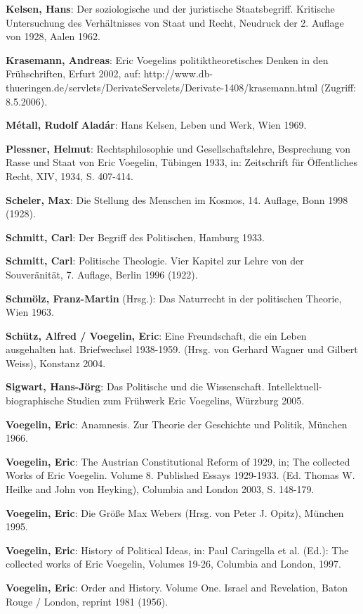 \documentclass[12pt,a4paper,ngerman]{article}
\begin{document}
{\bf Kelsen, Hans}: Der soziologische und der juristische Staatsbegriff.
Kritische Untersuchung des Verhältnisses von Staat und Recht, Neudruck der 2.
Auflage von 1928, Aalen 1962.

{\bf Krasemann, Andreas}: Eric Voegelins politiktheoretisches Denken in den
Frühschriften, Erfurt 2002, auf:
http://www.db-thueringen.de/servlets/DerivateServelets/Derivate-1408/krasemann.html
(Zugriff: 8.5.2006).

{\bf Métall, Rudolf Aladár}: Hans Kelsen, Leben und Werk, Wien 1969.

{\bf Plessner, Helmut}: Rechtsphilosophie und Gesellschaftslehre,
Besprechung von Rasse und Staat von Eric Voegelin, Tübingen 1933, in:
Zeitschrift für Öffentliches Recht, XIV, 1934, S. 407-414.

{\bf Scheler, Max}: Die Stellung des Menschen im Kosmos, 14. Auflage, Bonn
1998 (1928).

{\bf Schmitt, Carl}: Der Begriff des Politischen, Hamburg 1933.

{\bf Schmitt, Carl}: Politische Theologie. Vier Kapitel zur Lehre von
der Souveränität, 7. Auflage, Berlin 1996 (1922).

{\bf Schmölz, Franz-Martin} (Hrsg.): Das Naturrecht in der politischen
Theorie, Wien 1963.

{\bf Schütz, Alfred / Voegelin, Eric}: Eine Freundschaft, die ein Leben
ausgehalten hat. Briefwechsel 1938-1959. (Hrsg. von Gerhard Wagner und Gilbert
Weiss), Konstanz 2004.

{\bf Sigwart, Hans-Jörg}: Das Politische und die Wissenschaft.
Intellektuell-biographische Studien zum Frühwerk Eric Voegelins,
Würzburg 2005.

{\bf Voegelin, Eric}: Anamnesis. Zur Theorie der Geschichte und
Politik, München 1966.

{\bf Voegelin, Eric}: The Austrian Constitutional Reform of 1929, in;
The collected Works of Eric Voegelin. Volume 8.  Published Essays
1929-1933. (Ed. Thomas W. Heilke and John von Heyking), Columbia and
London 2003, S. 148-179.

{\bf Voegelin, Eric}: Die Größe Max Webers (Hrsg. von Peter J.
Opitz), München 1995.

{\bf Voegelin, Eric}: History of Political Ideas, in: Paul Caringella
et al. (Ed.): The collected works of Eric Voegelin, Volumes 19-26,
Columbia and London, 1997.

{\bf Voegelin, Eric}: Order and History. Volume One. Israel and
Revelation, Baton Rouge / London, reprint 1981 (1956).
\end{document}
